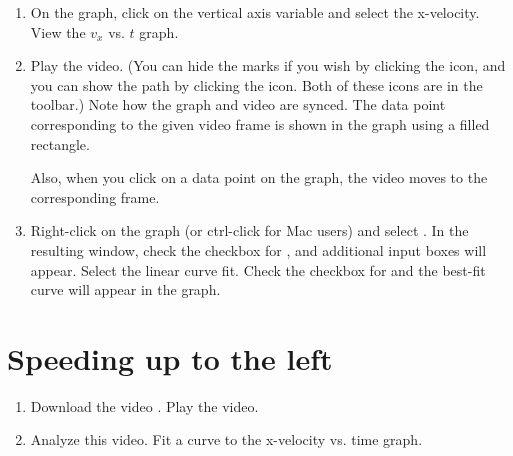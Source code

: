 \begin{enumerate}
	\item On the graph, click on the vertical axis variable and select the x-velocity. View the $v_x$ vs. $t$ graph. 
		
	\item Play the video. (You can hide the marks if you wish by clicking the  icon, and you can show the path by clicking the  icon. Both of these icons are in the toolbar.) Note how the graph and video are synced. The data point corresponding to the given video frame is shown in the graph using a filled rectangle.
	
	Also, when you click on a data point on the graph, the video moves to the corresponding frame.

		
	
					
	\item  Right-click on the graph (or ctrl-click for Mac users) and select . In the resulting window, check the checkbox for , and additional input boxes will appear. Select the linear curve fit. Check the checkbox for  and the best-fit curve will appear in the graph.
			
	
	
	
		
\end{enumerate}

\section*{Speeding up to the left}

\procedure

\begin{enumerate}
	\item Download the video . Play the video.
	
	
	
	\item Analyze this video. Fit a curve to the x-velocity vs. time graph.
	
\end{enumerate}

